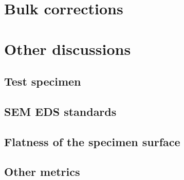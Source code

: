 \section{Bulk corrections}
\label{discussion:bulk_corrections}














\section{Other discussions}
\label{discussion:other}

\subsection{Test specimen}
\label{discussion:other:test_specimen}

\subsection{SEM EDS standards}
\label{discussion:other:sem_eds_standards}

\subsection{Flatness of the specimen surface}
\label{discussion:other:flatness}

\subsection{Other metrics}
\label{discussion:other:other_metrics}






















